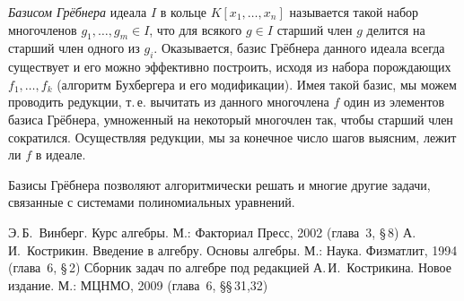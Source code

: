 \documentclass[a4paper,10pt]{amsart}
\theoremstyle{definition}
\theoremstyle{remark}
\begin{document}
{\it Базисом Грёбнера} идеала $I$ в кольце $K[x_1,\ldots,x_n]$
называется такой набор многочленов $g_1, \ldots, g_m \in I$, что для
всякого $g \in I$ старший член $g$ делится на старший член одного из
$g_i$. Оказывается, базис Грёбнера данного идеала всегда существует
и его можно эффективно построить, исходя из набора порождающих $f_1,
\ldots, f_k$ (алгоритм Бухбергера и его модификации). Имея такой
базис, мы можем проводить редукции, т.\,е. вычитать из данного
многочлена $f$ один из элементов базиса Грёбнера, умноженный на
некоторый многочлен так, чтобы старший член сократился. Осуществляя
редукции, мы за конечное число шагов выясним, лежит ли $f$ в идеале.

Базисы Грёбнера позволяют алгоритмически решать и многие другие
задачи, связанные с системами полиномиальных уравнений.

\bigskip

\begin{thebibliography}{99}
Э.\,Б.~Винберг. Курс алгебры. М.: Факториал Пресс, 2002 (глава~3,
\S\,8)
А.\,И.~Кострикин. Введение в алгебру. Основы алгебры. М.: Наука.
Физматлит, 1994 (глава~6, \S\,2)
Сборник задач по алгебре под редакцией А.\,И.~Кострикина. Новое
издание. М.: МЦНМО, 2009 (глава~6, \S\S\,31,32)
\end{thebibliography}
\end{document}
